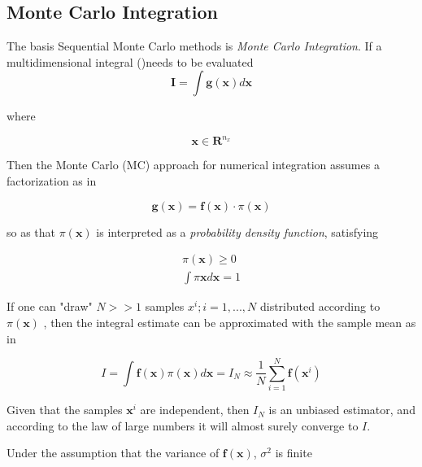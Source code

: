 \subsection{Monte Carlo Integration}
The basis Sequential Monte Carlo methods is \emph{Monte Carlo Integration}. If a multidimensional integral ()needs to be evaluated 
\begin{equation}
\label{eq:MCI}
\mathbf{I} = \int \mathbf{g(x)} d\mathbf{x}
\end{equation}

where 

\begin{equation}
	 \mathbf{x} \in \mathbf{R}^{n_{x}} 
\end{equation}


Then the Monte Carlo (MC) approach for numerical integration assumes a factorization as in 

\begin{equation}
\label{eq:MCIfact}\mathbf{g(x)} = \mathbf{f(x)} \cdot \pi(\mathbf{x}) 
\end{equation}


so  as that $\pi(\mathbf{x})$ is interpreted as a \emph{probability density function}, satisfying 

\begin{equation}\label{eq:MCI2}
\begin{aligned}
\pi(\mathbf{x}) \geq 0 \\
\int \pi \mathbf{x} d \mathbf{x} = 1
\end{aligned}
\end{equation}




If one can "draw" $N >> 1$ samples ${x^i; i = 1,...,N}$ distributed according to $\pi (\mathbf{x})$ , then the integral estimate can be approximated with the sample mean as in  

\begin{equation}\label{eq:MCI3}
I = \int \mathbf{f}(\mathbf{x})\pi(\mathbf{x}) d\mathbf{x} = I_N \approx \frac{1}{N}\sum_{i=1}^{N} \mathbf{f}(\mathbf{x}^i)
\end{equation}


Given that the samples $\mathbf{x}^i$ are independent, then $I_N$ is an unbiased estimator, and according to the law of large numbers it will almost surely converge to $I$.


Under the assumption that the variance of $\mathbf{f}(\mathbf{x})$, $\sigma^2$ is finite

